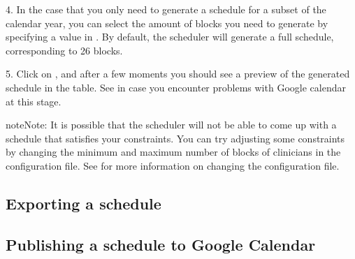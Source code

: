 \documentclass[letterpaper,10pt,english]{sphinxmanual}
\begin{document}
4.  In the case that you only need to generate a schedule for
a subset of the calendar year, you can select the amount of blocks you need
to generate by specifying a value in . By default, the
scheduler will generate a full schedule, corresponding to 26 blocks.

5. Click on , and after a few moments you should see a preview of
the generated schedule in the table.  See {\hyperref[\detokenize{index:authentication}]{}}
in case you encounter problems with Google calendar at this stage.

\begin{sphinxadmonition}{note}{Note:}
It is possible that the scheduler will not be able to come up with a
schedule that satisfies your constraints. You can try adjusting
some constraints by changing the minimum and maximum number of blocks of
clinicians in the configuration file. See {\hyperref[\detokenize{index:clinician-configuration}]{}}
for more information on changing the configuration file.
\end{sphinxadmonition}


\subsection{Exporting a schedule}
\label{\detokenize{index:exporting-a-schedule}}

\subsection{Publishing a schedule to Google Calendar}
\label{\detokenize{index:publishing-a-schedule-to-google-calendar}}\label{\detokenize{index:id6}}


\renewcommand{\indexname}{Index}
\printindex
\end{document}
